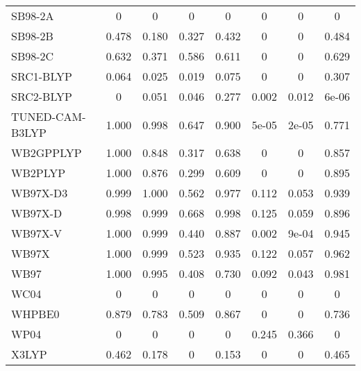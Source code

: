 \begin{table*}
\begin{tabular}{|l|c|c|c|c|c|c|c|}
SB98-2A~\cite{Schmider1998_9624} & 0 & 0 & 0 & 0 & 0 & 0 & 0 \\
SB98-2B~\cite{Schmider1998_9624} & 0.478 & 0.180 & 0.327 & 0.432 & 0 & 0 & 0.484 \\
SB98-2C~\cite{Schmider1998_9624} & 0.632 & 0.371 & 0.586 & 0.611 & 0 & 0 & 0.629 \\
SRC1-BLYP~\cite{Besley2009_10350} & 0.064 & 0.025 & 0.019 & 0.075 & 0 & 0 & 0.307 \\
SRC2-BLYP~\cite{Besley2009_10350} & 0 & 0.051 & 0.046 & 0.277 & 0.002 & 0.012 & 6e-06 \\
TUNED-CAM-B3LYP~\cite{Okuno2012_29} & 1.000 & 0.998 & 0.647 & 0.900 & 5e-05 & 2e-05 & 0.771 \\
WB2GPPLYP~\cite{CasanovaPaez2019_4735} & 1.000 & 0.848 & 0.317 & 0.638 & 0 & 0 & 0.857 \\
WB2PLYP~\cite{CasanovaPaez2019_4735} & 1.000 & 0.876 & 0.299 & 0.609 & 0 & 0 & 0.895 \\
WB97X-D3~\cite{Lin2013_263} & 0.999 & 1.000 & 0.562 & 0.977 & 0.112 & 0.053 & 0.939 \\
WB97X-D~\cite{Chai2008_6615} & 0.998 & 0.999 & 0.668 & 0.998 & 0.125 & 0.059 & 0.896 \\
WB97X-V~\cite{Mardirossian2014_9904} & 1.000 & 0.999 & 0.440 & 0.887 & 0.002 & 9e-04 & 0.945 \\
WB97X~\cite{Chai2008_084106} & 1.000 & 0.999 & 0.523 & 0.935 & 0.122 & 0.057 & 0.962 \\
WB97~\cite{Chai2008_084106} & 1.000 & 0.995 & 0.408 & 0.730 & 0.092 & 0.043 & 0.981 \\
WC04~\cite{Wiitala2006_1085} & 0 & 0 & 0 & 0 & 0 & 0 & 0 \\
WHPBE0~\cite{Shao2020_587} & 0.879 & 0.783 & 0.509 & 0.867 & 0 & 0 & 0.736 \\
WP04~\cite{Wiitala2006_1085} & 0 & 0 & 0 & 0 & 0.245 & 0.366 & 0 \\
X3LYP~\cite{Xu2004_2673} & 0.462 & 0.178 & 0 & 0.153 & 0 & 0 & 0.465 \\
\bottomrule
\end{tabular}
\end{table*}
